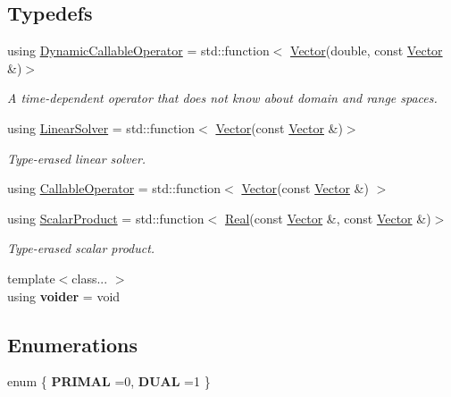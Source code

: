 \subsection*{Typedefs}
\begin{DoxyCompactItemize}
\item 
using \hyperlink{namespaceSpacy_a052e6b83b913fc316b0c2a2cd9535431}{Dynamic\-Callable\-Operator} = std\-::function$<$ \hyperlink{classSpacy_1_1Vector}{Vector}(double, const \hyperlink{classSpacy_1_1Vector}{Vector} \&)$>$
\begin{DoxyCompactList}\small\item\em A time-\/dependent operator that does not know about domain and range spaces. \end{DoxyCompactList}\item 
\hypertarget{namespaceSpacy_adcd0d78166a9c972b8a2e5a689fc2d03}{using \hyperlink{namespaceSpacy_adcd0d78166a9c972b8a2e5a689fc2d03}{Linear\-Solver} = std\-::function$<$ \hyperlink{classSpacy_1_1Vector}{Vector}(const \hyperlink{classSpacy_1_1Vector}{Vector} \&)$>$}\label{namespaceSpacy_adcd0d78166a9c972b8a2e5a689fc2d03}

\begin{DoxyCompactList}\small\item\em Type-\/erased linear solver. \end{DoxyCompactList}\item 
using \hyperlink{namespaceSpacy_a022a87afa759e18781dd2aea9a80cd73}{Callable\-Operator} = std\-::function$<$ \hyperlink{classSpacy_1_1Vector}{Vector}(const \hyperlink{classSpacy_1_1Vector}{Vector} \&) $>$
\item 
using \hyperlink{namespaceSpacy_aa995526aa0e3fa58aca8dd6772311cad}{Scalar\-Product} = std\-::function$<$ \hyperlink{classSpacy_1_1Real}{Real}(const \hyperlink{classSpacy_1_1Vector}{Vector} \&, const \hyperlink{classSpacy_1_1Vector}{Vector} \&)$>$
\begin{DoxyCompactList}\small\item\em Type-\/erased scalar product. \end{DoxyCompactList}\item 
\hypertarget{namespaceSpacy_a104eb3859bf3e6465a7789c84e9ab1f7}{{\footnotesize template$<$class... $>$ }\\using {\bfseries voider} = void}\label{namespaceSpacy_a104eb3859bf3e6465a7789c84e9ab1f7}

\end{DoxyCompactItemize}
\subsection*{Enumerations}
\begin{DoxyCompactItemize}
\item 
enum \{ {\bfseries P\-R\-I\-M\-A\-L} =0, 
{\bfseries D\-U\-A\-L} =1
 \}
\end{DoxyCompactItemize}
